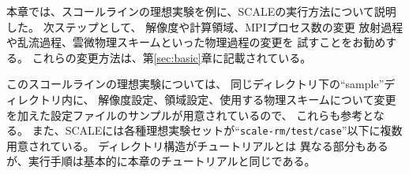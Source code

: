 本章では、スコールラインの理想実験を例に、SCALEの実行方法について説明した。
次ステップとして、
解像度や計算領域、MPIプロセス数の変更
放射過程や乱流過程、雲微物理スキームといった物理過程の変更を
試すことをお勧めする。
これらの変更方法は、第\ref{sec:basic}章に記載されている。

このスコールラインの理想実験については、
同じディレクトリ下の``sample''ディレクトリ内に、
解像度設定、領域設定、使用する物理スキームについて変更を加えた設定ファイルのサンプルが用意されているので、
これらも参考となる。
また、SCALEには各種理想実験セットが``\verb|scale-rm/test/case|''以下に複数用意されている。
ディレクトリ構造がチュートリアルとは
異なる部分もあるが、実行手順は基本的に本章のチュートリアルと同じである。


